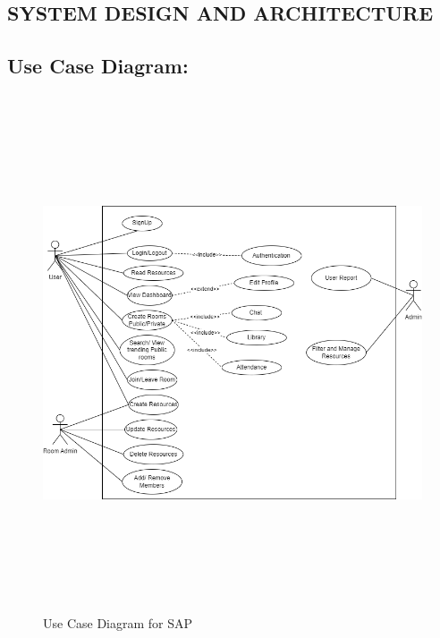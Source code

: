 \begin{center}
\section{SYSTEM DESIGN AND ARCHITECTURE}
\end{center}
\subsection{Use Case Diagram:}
\begin{figure}[h]
    \centering
    \includegraphics[width=6in, height=6in]{Proposal/static/use_case_sap.drawio.png}
    \caption{Use Case Diagram for SAP}
    \label{fig:enter-label}
\end{figure}
\newpage

